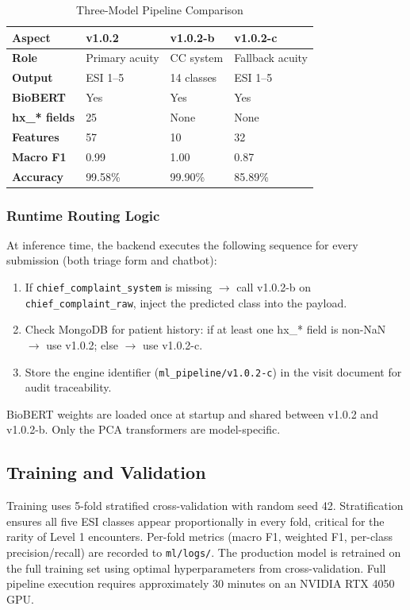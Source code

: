 \documentclass[conference]{IEEEtran}
\begin{document}
\begin{table}[t]
\caption{Three-Model Pipeline Comparison}
\label{tab:models}
\renewcommand{\arraystretch}{1.2}
\begin{tabularx}{\columnwidth}{>{\bfseries}lXXX}
\toprule
Aspect & v1.0.2 & v1.0.2-b & v1.0.2-c \\
\midrule
Role & Primary acuity & CC system & Fallback acuity \\
Output & ESI 1--5 & 14 classes & ESI 1--5 \\
BioBERT & Yes & Yes & Yes \\
hx\_* fields & 25 & None & None \\
Features & 57 & 10 & 32 \\
Macro F1 & 0.99 & 1.00 & 0.87 \\
Accuracy & 99.58\% & 99.90\% & 85.89\% \\
\bottomrule
\end{tabularx}
\end{table}

\subsubsection{Runtime Routing Logic}
At inference time, the backend executes the following sequence for every submission (both triage form and chatbot):
\begin{enumerate}
\item If \texttt{chief\_complaint\_system} is missing $\rightarrow$ call v1.0.2-b on \texttt{chief\_complaint\_raw}, inject the predicted class into the payload.
\item Check MongoDB for patient history: if at least one hx\_* field is non-NaN $\rightarrow$ use v1.0.2; else $\rightarrow$ use v1.0.2-c.
\item Store the engine identifier (\texttt{ml\_pipeline/v1.0.2-c}) in the visit document for audit traceability.
\end{enumerate}

BioBERT weights are loaded once at startup and shared between v1.0.2 and v1.0.2-b. Only the PCA transformers are model-specific.

\subsection{Training and Validation}
Training uses 5-fold stratified cross-validation with random seed 42. Stratification ensures all five ESI classes appear proportionally in every fold, critical for the rarity of Level 1 encounters. Per-fold metrics (macro F1, weighted F1, per-class precision/recall) are recorded to \texttt{ml/logs/}. The production model is retrained on the full training set using optimal hyperparameters from cross-validation. Full pipeline execution requires approximately 30 minutes on an NVIDIA RTX 4050 GPU.
\end{document}

